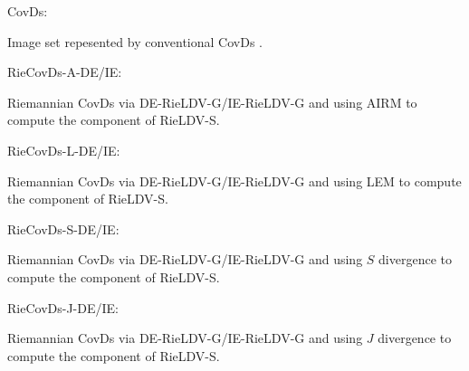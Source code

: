 \documentclass[review]{elsarticle}
\begin{document}
\begin{bfseries}CovDs:\end{bfseries} Image set repesented by conventional CovDs \cite{wang2012covariance}.\\
\begin{bfseries}RieCovDs-A-DE/IE:\end{bfseries} Riemannian CovDs via DE-RieLDV-G/IE-RieLDV-G and using AIRM to compute the component of RieLDV-S.\\
\begin{bfseries}RieCovDs-L-DE/IE:\end{bfseries} Riemannian CovDs via DE-RieLDV-G/IE-RieLDV-G and using LEM to compute the component of RieLDV-S.\\
\begin{bfseries}RieCovDs-S-DE/IE:\end{bfseries} Riemannian CovDs via DE-RieLDV-G/IE-RieLDV-G and using $S$ divergence to compute the component of RieLDV-S.\\
\begin{bfseries}RieCovDs-J-DE/IE:\end{bfseries} Riemannian CovDs via DE-RieLDV-G/IE-RieLDV-G and using $J$ divergence to compute the component of RieLDV-S.\\
\end{document}
